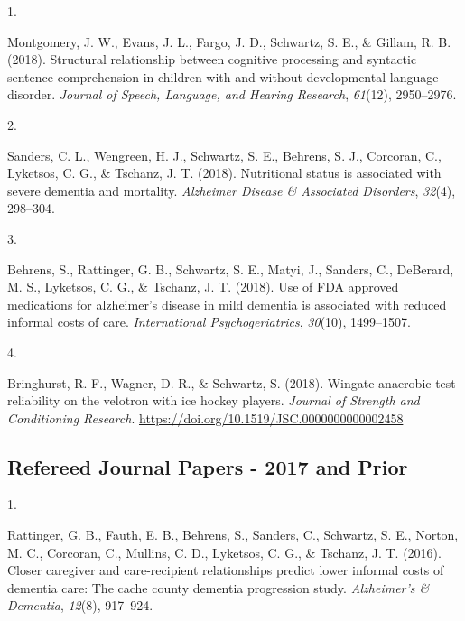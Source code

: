 \documentclass[11pt,a4paper,]{moderncv}
\newlength{\csllabelwidth}
\newcommand{\CSLLeftMargin}[1]{\parbox[t]{\csllabelwidth}{#1}}
\newcommand{\CSLRightInline}[1]{\parbox[t]{\linewidth - \csllabelwidth}{#1}}
\begin{document}
\hypertarget{refs_journals2018}{}
\leavevmode{}%
\CSLLeftMargin{1. }
\CSLRightInline{Montgomery, J. W., Evans, J. L., Fargo, J. D., Schwartz,
S. E., \& Gillam, R. B. (2018). Structural relationship between
cognitive processing and syntactic sentence comprehension in children
with and without developmental language disorder. \emph{Journal of
Speech, Language, and Hearing Research}, \emph{61}(12), 2950--2976.}

\leavevmode{}%
\CSLLeftMargin{2. }
\CSLRightInline{Sanders, C. L., Wengreen, H. J., Schwartz, S. E.,
Behrens, S. J., Corcoran, C., Lyketsos, C. G., \& Tschanz, J. T. (2018).
Nutritional status is associated with severe dementia and mortality.
\emph{Alzheimer Disease \& Associated Disorders}, \emph{32}(4),
298--304.}

\leavevmode{}%
\CSLLeftMargin{3. }
\CSLRightInline{Behrens, S., Rattinger, G. B., Schwartz, S. E., Matyi,
J., Sanders, C., DeBerard, M. S., Lyketsos, C. G., \& Tschanz, J. T.
(2018). Use of FDA approved medications for alzheimer's disease in mild
dementia is associated with reduced informal costs of care.
\emph{International Psychogeriatrics}, \emph{30}(10), 1499--1507.}

\leavevmode{}%
\CSLLeftMargin{4. }
\CSLRightInline{Bringhurst, R. F., Wagner, D. R., \& Schwartz, S.
(2018). Wingate anaerobic test reliability on the velotron with ice
hockey players. \emph{Journal of Strength and Conditioning Research}.
\url{https://doi.org/10.1519/JSC.0000000000002458}}

\vspace{7mm}

\hypertarget{refereed-journal-papers---2017-and-prior}{%
\subsection{\texorpdfstring{\textbf{Refereed Journal Papers - 2017 and
Prior}}{Refereed Journal Papers - 2017 and Prior}}\label{refereed-journal-papers---2017-and-prior}}

\hypertarget{refs_journals2017}{}
\leavevmode{}%
\CSLLeftMargin{1. }
\CSLRightInline{Rattinger, G. B., Fauth, E. B., Behrens, S., Sanders,
C., Schwartz, S. E., Norton, M. C., Corcoran, C., Mullins, C. D.,
Lyketsos, C. G., \& Tschanz, J. T. (2016). Closer caregiver and
care-recipient relationships predict lower informal costs of dementia
care: The cache county dementia progression study. \emph{Alzheimer's \&
Dementia}, \emph{12}(8), 917--924.}
\end{document}
